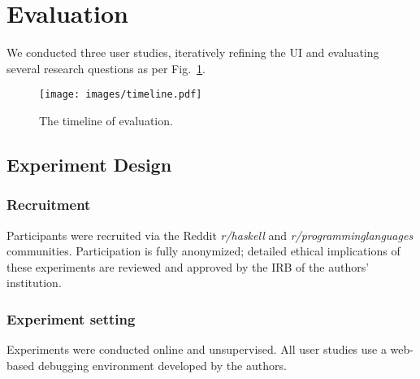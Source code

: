 \section{Evaluation}

We conducted three user studies, iteratively refining the \chameleon{} UI and evaluating several research questions as per Fig.~\ref{fig:timeline}. 



\begin{figure}[ht]
    \centering
    \texttt{[image: images/timeline.pdf]}
    \caption[The timeline of \chameleon{}  evaluation]{The timeline of \chameleon{}  evaluation.}
    \label{fig:timeline}
\end{figure}

\subsection{Experiment Design}
\subsubsection*{\textbf{Recruitment}}

Participants were recruited via the Reddit \textit{r/haskell} and \textit{r/programminglanguages} communities. 
Participation is fully anonymized; detailed ethical implications of these experiments are reviewed and approved by the IRB of the authors' institution.


\subsubsection*{\textbf{Experiment setting}}
Experiments were conducted online and unsupervised. 
All user studies use a web-based debugging environment developed by the authors. 


